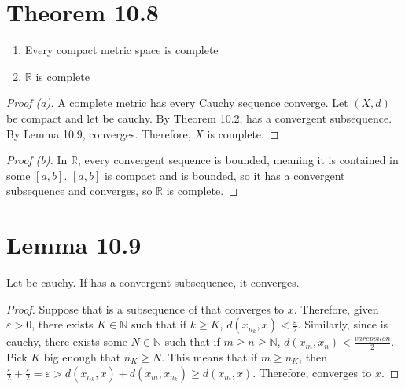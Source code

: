 \documentclass[11pt]{article}
\begin{document}
\section{Theorem 10.8}
    \begin{enumerate}[label=(\alph*)]
        \item   Every compact metric space is complete
        \item   $\mathbb{R}$ is complete
    \end{enumerate}
    \begin{proof}[Proof (a)]
        A complete metric has every Cauchy sequence converge.
        Let $(X,d)$ be compact and let  be cauchy.
        By Theorem 10.2,  has a convergent subsequence.
        By Lemma 10.9,  converges.
        Therefore, $X$ is complete.
    \end{proof}
    \begin{proof}[Proof (b)]
        In $\mathbb{R}$, every convergent sequence  is bounded, meaning it is contained in some $[a,b]$.
        $[a,b]$ is compact and  is bounded, so it has a convergent subsequence and converges, so $\mathbb{R}$ is complete.
    \end{proof}

\section{Lemma 10.9}
    Let  be cauchy.
    If  has a convergent subsequence, it converges.
    \begin{proof}
        Suppose that  is a subsequence of  that converges to $x$.
        Therefore, given $\varepsilon > 0$, there exists $K \in \mathbb{N}$ such that if $k \geq K$, $d(x_{n_k}, x) < \frac{\varepsilon}{2}$.
        Similarly, since  is cauchy, there exists some $N \in \mathbb{N}$ such that if $m \geq n \geq \mathbb{N}$, $d(x_m, x_n) < \frac{varepsilon}{2}$.
        Pick $K$ big enough that $n_K \geq N$.
        This means that if $m \geq n_K$, then $\frac{\varepsilon}{2} + \frac{\varepsilon}{2} = \varepsilon > d(x_{n_k}, x) + d(x_m, x_{n_k}) \geq d(x_m, x)$.
        Therefore,  converges to $x$.
    \end{proof}
\end{document}
